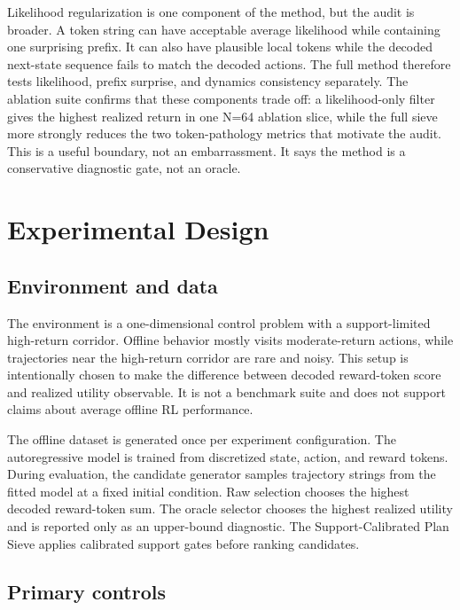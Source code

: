 \documentclass{article}
\newcommand{\method}{Support-Calibrated Plan Sieve}
\begin{document}
Likelihood regularization is one component of the method, but the audit is broader. A token string can have acceptable average likelihood while containing one surprising prefix. It can also have plausible local tokens while the decoded next-state sequence fails to match the decoded actions. The full method therefore tests likelihood, prefix surprise, and dynamics consistency separately. The ablation suite confirms that these components trade off: a likelihood-only filter gives the highest realized return in one N=64 ablation slice, while the full sieve more strongly reduces the two token-pathology metrics that motivate the audit. This is a useful boundary, not an embarrassment. It says the method is a conservative diagnostic gate, not an oracle.

\section{Experimental Design}

\subsection{Environment and data}

The environment is a one-dimensional control problem with a support-limited high-return corridor. Offline behavior mostly visits moderate-return actions, while trajectories near the high-return corridor are rare and noisy. This setup is intentionally chosen to make the difference between decoded reward-token score and realized utility observable. It is not a benchmark suite and does not support claims about average offline RL performance.

The offline dataset is generated once per experiment configuration. The autoregressive model is trained from discretized state, action, and reward tokens. During evaluation, the candidate generator samples trajectory strings from the fitted model at a fixed initial condition. Raw selection chooses the highest decoded reward-token sum. The oracle selector chooses the highest realized utility and is reported only as an upper-bound diagnostic. The \method{} applies calibrated support gates before ranking candidates.

\subsection{Primary controls}
\end{document}
